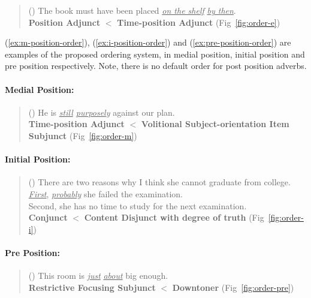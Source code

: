 \smallskip
\begin{quote}
 \small
 ()
 The book must have been placed 
 \underline{\em on the shelf} \underline{\em by then}. \\
 {\bf Position Adjunct} $<$ {\bf Time-position Adjunct} (Fig~\ref{fig:order-e})
 
\end{quote}

(\ref{ex:m-position-order}), (\ref{ex:i-position-order}) and
(\ref{ex:pre-position-order}) are examples of the proposed ordering
system, in medial position, initial position and pre position
respectively.  Note, there is no default order for post position
adverbs.


\paragraph{Medial Position:}
\begin{quote}
 \small
 ()
 He is {\em \underline{still} \underline{purposely}} against our plan. \\
 \footnotesize
 {\bf Time-position Adjunct} $<$ 
 {\bf Volitional Subject-orientation Item Subjunct} (Fig~\ref{fig:order-m})
 \vspace*{-2mm}
\end{quote}

\paragraph{Initial Position:}
\begin{quote}
 \small
 ()
 There are two reasons why I think she cannot graduate from college. \\
 \hspace*{5mm} \underline{\em First}, \underline{\em probably} 
               she failed the examination. \\
 \hspace*{5mm} Second, she has no time to study for the next examination. \\
 \footnotesize
 {\bf Conjunct} $<$ {\bf Content Disjunct with degree of truth} (Fig~\ref{fig:order-i})
  
 \vspace*{-2mm}
\end{quote}

\paragraph{Pre Position:}
\begin{quote}
 \small
 ()
  This room is \underline{\em just} \underline{\em about} big enough. \\
 \footnotesize
 {\bf Restrictive Focusing Subjunct} $<$ {\bf Downtoner} (Fig~\ref{fig:order-pre})
  
 \vspace*{-2mm}
\end{quote}

